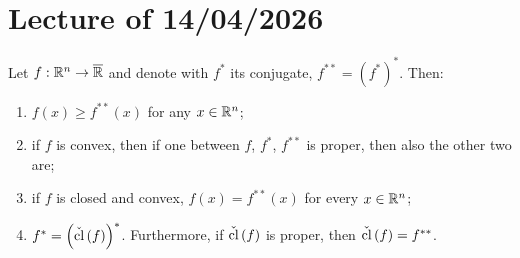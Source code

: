 \chapter{Lecture \thechapter{} of 14/04/2026}

\begin{proposition}

    Let $f : {\mathbb{R}^n} \to \overline{\mathbb{R}}$ and denote with $f^*$ its conjugate, $f^{**} = (f^*)^*$. Then: 

    \begin{enumerate}
        \item[a)] $f(x) \ge f^{**}(x)$ for any $x \in {\mathbb{R}^n}$;
        \item[b)] if $f$ is convex, then if one between $f$, $f^*$, $f^{**}$ is proper, then also the other two are;
        \item[c)] if $f$ is closed and convex, $f(x) = f^{**}(x)$ for every $x \in {\mathbb{R}^n}$;
        \item[d)] $f^* = \left(\check{\mathrm{cl}}\left(f\right)\right)^*$. Furthermore, if $\check{\mathrm{cl}}\left(f\right)$ is proper, then $\check{\mathrm{cl}}\left(f\right) = f^{**}$.
    \end{enumerate}
    
\end{proposition}


